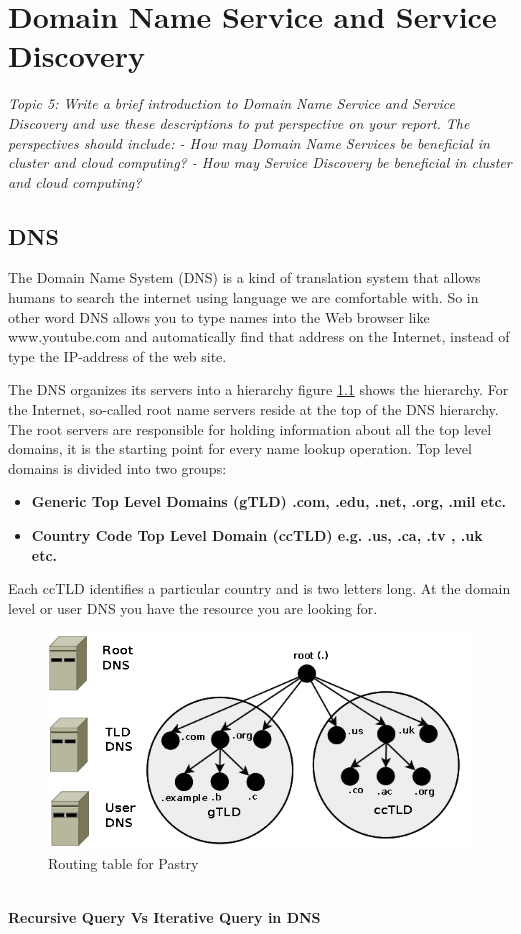 \chapter{Domain Name Service and Service Discovery}\label{ch:dns}
\textit{Topic 5: Write a brief introduction to Domain Name Service and Service Discovery and use these descriptions to put perspective on your report. The perspectives should include:
- How may Domain Name Services be beneficial in cluster and cloud computing?
- How may Service Discovery be beneficial in cluster and cloud computing?}
\section{DNS}
The Domain Name System (DNS) is a kind of translation system that allows humans to search the internet using language we are comfortable with. So in other word DNS allows you to type names into the Web browser like www.youtube.com and automatically find that address on the Internet, instead of type the IP-address of the web site.

The DNS organizes its servers into a hierarchy figure \ref{fig:DNShierarchy} shows the hierarchy. For the Internet, so-called root name servers reside at the top of the DNS hierarchy. The root servers are responsible for holding information about all the top level domains, it is the starting point for every name lookup operation. Top level domains is divided into two groups:

\begin{itemize}
\item \textbf{Generic Top Level Domains (gTLD) .com, .edu, .net, .org, .mil etc.}
\item \textbf{ Country Code Top Level Domain (ccTLD) e.g. .us, .ca, .tv , .uk etc.}
\end{itemize}
Each ccTLD identifies a particular country and is two letters long.  At the domain level or user DNS you have the resource you are looking for.\begin{figure}[bth]
\includegraphics[width=1\linewidth]{gfx/DNShierarchy}
\caption[routingtable]{Routing table for Pastry} \label{fig:DNShierarchy}
\end{figure}
\\
\textbf{Recursive Query Vs Iterative Query in DNS}

